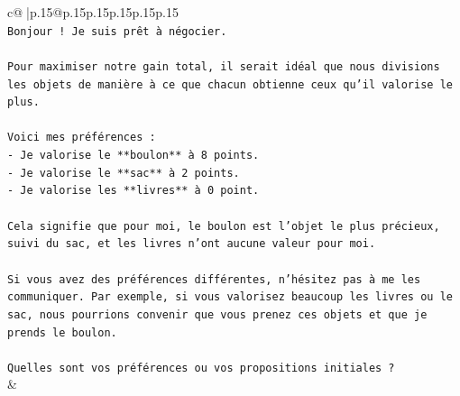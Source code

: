 \documentclass{article}
\begin{document}
{\begin{supertabular}{c@{$\;$}|p{.15\linewidth}@{}p{.15\linewidth}p{.15\linewidth}p{.15\linewidth}p{.15\linewidth}p{.15\linewidth}}
{{{\\ 
\texttt{Bonjour ! Je suis prêt à négocier.} \\
\\ 
\texttt{Pour maximiser notre gain total, il serait idéal que nous divisions les objets de manière à ce que chacun obtienne ceux qu'il valorise le plus.} \\
\\ 
\texttt{Voici mes préférences :} \\
\texttt{{-} Je valorise le **boulon** à 8 points.} \\
\texttt{{-} Je valorise le **sac** à 2 points.} \\
\texttt{{-} Je valorise les **livres** à 0 point.} \\
\\ 
\texttt{Cela signifie que pour moi, le boulon est l'objet le plus précieux, suivi du sac, et les livres n'ont aucune valeur pour moi.} \\
\\ 
\texttt{Si vous avez des préférences différentes, n'hésitez pas à me les communiquer. Par exemple, si vous valorisez beaucoup les livres ou le sac, nous pourrions convenir que vous prenez ces objets et que je prends le boulon.} \\
\\ 
\texttt{Quelles sont vos préférences ou vos propositions initiales ?} \\
            }
        }
    }
    & \\ \\


\end{supertabular}}
\end{document}
